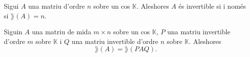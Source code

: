 \documentclass[../Apunts.tex]{subfiles}
\begin{document}
	\begin{corollary}
		Sigui \(A\) una matriu d'ordre \(n\) sobre un cos \(\mathbb{K}\). Aleshores \(A\) és invertible si i només si \(\rang(A)=n\).
	\end{corollary}
	\begin{observation}
		\label{obs:rang d'una matriu és invariant pel producte amb invertibles}
		Siguin \(A\) una matriu de mida \(m\times n\) sobre un cos \(\mathbb{K}\), \(P\) una matriu invertible d'ordre \(m\) sobre \(\mathbb{K}\) i \(Q\) una matriu invertible d'ordre \(n\) sobre \(\mathbb{K}\). Aleshores
		\[\rang(A)=\rang(PAQ).\]
	\end{observation}
%		
\end{document}
